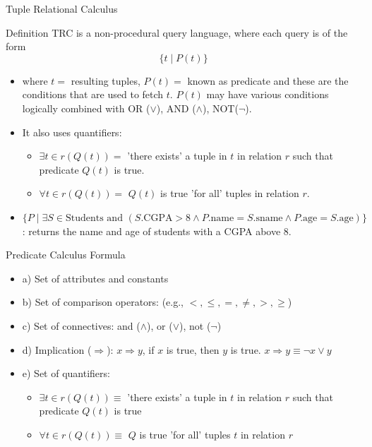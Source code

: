 \documentclass[aspectratio=169, xcolor=dvipsnames]{beamer}
\begin{document}
\begin{frame}{Tuple Relational Calculus}
    \begin{block}{Definition}
        TRC is a non-procedural query language, where each query is of the form
        \[ \{t \mid P(t)\} \]
        \begin{itemize}[<+->]
            \item where $t =$ resulting tuples, $P(t) =$ known as predicate and these are the conditions that are used to fetch $t$. $P(t)$ may have various conditions logically combined with OR ($\lor$), AND ($\land$), NOT($\lnot$).
            \item It also uses quantifiers:
            \begin{itemize}
                \item[$\triangleright$] $\exists t \in r (Q(t)) =$ 'there exists' a tuple in $t$ in relation $r$ such that predicate $Q(t)$ is true.
                \item[$\triangleright$] $\forall t \in r (Q(t)) =$ $Q(t)$ is true 'for all' tuples in relation $r$.
            \end{itemize}
            \item $\{P \mid \exists S \in \text{Students and } (S.\text{CGPA} > 8 \land P.\text{name} = S.\text{sname} \land P.\text{age} = S.\text{age})\}$: returns the name and age of students with a CGPA above 8.
        \end{itemize}
    \end{block}
\end{frame}

\begin{frame}{Predicate Calculus Formula}
    \begin{itemize}[<+->]
        \item a) Set of attributes and constants
        \item b) Set of comparison operators: (e.g., $<, \leq, =, \neq, >, \geq$)
        \item c) Set of connectives: and ($\land$), or ($\lor$), not ($\lnot$)
        \item d) Implication ($\Rightarrow$): $x \Rightarrow y$, if $x$ is true, then $y$ is true. $x \Rightarrow y \equiv \lnot x \lor y$
        \item e) Set of quantifiers:
        \begin{itemize}
            \item[$\triangleright$] $\exists t \in r (Q(t)) \equiv$ 'there exists' a tuple in $t$ in relation $r$ such that predicate $Q(t)$ is true
            \item[$\triangleright$] $\forall t \in r (Q(t)) \equiv$ $Q$ is true 'for all' tuples $t$ in relation $r$
        \end{itemize}
    \end{itemize}
\end{frame}
\end{document}
